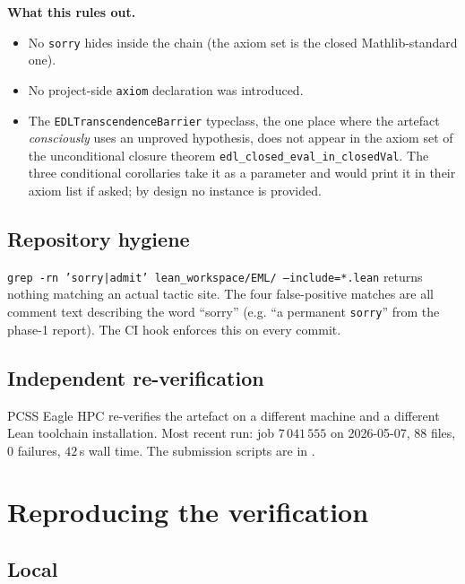 \documentclass[11pt,a4paper]{article}
\theoremstyle{plain}
\theoremstyle{definition}
\begin{document}
\noindent\textbf{What this rules out.}
\begin{itemize}[topsep=2pt, itemsep=2pt]
  \item No \texttt{sorry} hides inside the chain (the axiom set is
    the closed Mathlib-standard one).
  \item No project-side \texttt{axiom} declaration was introduced.
  \item The \texttt{EDLTranscendenceBarrier} typeclass, the one
    place where the artefact \emph{consciously} uses an unproved
    hypothesis, does not appear in the axiom set of the
    unconditional closure theorem
    \texttt{edl\_closed\_eval\_in\_closedVal}. The three conditional
    corollaries take it as a parameter and would print it in their
    axiom list if asked; by design no instance is provided.
\end{itemize}

\subsection{Repository hygiene}

\texttt{grep -rn 'sorry|admit' lean\_workspace/EML/ --include=*.lean}
returns nothing matching an actual tactic site. The four false-positive
matches are all comment text describing the word ``sorry'' (e.g.
``a permanent \texttt{sorry}'' from the phase-1 report). The CI hook
 enforces this on every commit.

\subsection{Independent re-verification}

PCSS Eagle HPC re-verifies the artefact on a different machine and a
different Lean toolchain installation. Most recent run: job
$7\,041\,555$ on 2026-05-07, $88$ files, $0$ failures, $42$\,s wall
time. The submission scripts are in .

\section{Reproducing the verification}\label{sec:repro}

\subsection{Local}
\end{document}
